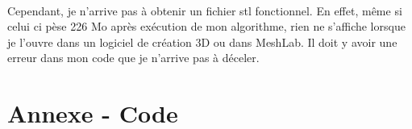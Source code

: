 \documentclass[a4paper,11pt]{article}
\begin{document}
\paragraph{} Cependant, je n'arrive pas à obtenir un fichier stl fonctionnel. En effet, même si celui ci pèse 226 Mo après exécution de mon algorithme, rien ne s'affiche lorsque je l'ouvre dans un logiciel de création 3D ou dans MeshLab. Il doit y avoir une erreur dans mon code que je n'arrive pas à déceler.

\vspace{3cm}
\section*{Annexe - Code}
\end{document}
